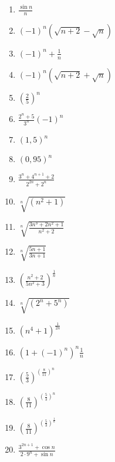 \documentclass{article}
\begin{document}
\begin{enumerate}[label=(\alph*)]

\bfseries

\item $ \frac{\sin n}{n} $

\item $ (-1)^n (\sqrt{n+2} - \sqrt{n}) $

\item $ (-1)^n + \frac{1}{n} $

\item $ (-1)^n (\sqrt{n+2} + \sqrt{n}) $

\item $ \left( \frac{2}{5} \right)^n $

\item $ \frac{2^n + 5}{3^n} (-1)^n $

\item $ (1,5)^n $

\item $ (0,95)^n $

\item $ \frac{3^n + 4^{n+1} +2}{2^{2n} + 2^n} $

\item $ \sqrt[n]{(n^2+1)} $

\item $ \sqrt[n]{\frac{3n^3+2n^2+1}{n^2+2}} $

\item $ \sqrt[n]{\frac{5n+1}{3n+1}} $

\item $ \left( \frac{n^2 + 2}{5n^2 + 3} \right)^{\frac{1}{n}} $

\item $ \sqrt[n]{(2^n + 5^n)} $

\item $ (n^4 + 1)^{\frac{1}{2n}} $

\item $ (1 + (-1)^n)^n \frac{1}{n} $

\item $ \left( \frac{5}{3} \right)^{ \left( \frac{8}{11} \right)^n } $

\item $ \left( \frac{8}{11} \right)^{ \left( \frac{5}{3} \right)^n } $

\item $ \left( \frac{8}{11} \right)^{ \left( \frac{5}{3} \right)^{\frac{1}{n}} } $

\item $ \frac{3^{2n+1} + \cos n}{2 \cdot 9^n + \sin n} $

\end{enumerate}
\end{document}
